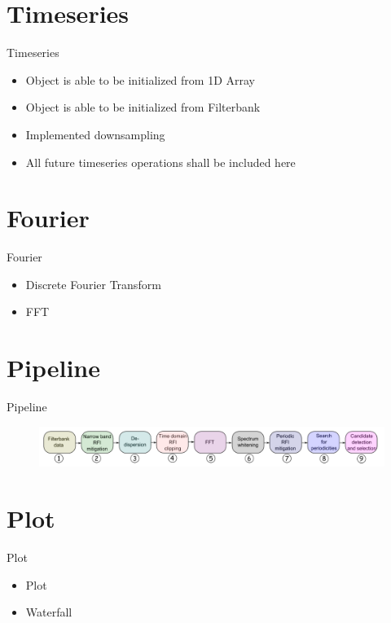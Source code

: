 \documentclass{beamer}
\begin{document}
\section{Timeseries}
\begin{frame}{Timeseries}
	\begin{itemize}
		\item Object is able to be initialized from 1D Array
		\item Object is able to be initialized from Filterbank
		\item Implemented downsampling
		\item All future timeseries operations shall be included here
	\end{itemize}
\end{frame}

\section{Fourier}
\begin{frame}{Fourier}
	\begin{itemize}
		\item Discrete Fourier Transform
		\item FFT
	\end{itemize}
\end{frame}

\section{Pipeline}
\begin{frame}{Pipeline}
	\begin{figure}
		\includegraphics[width=\textwidth]{pipeline-order}
	\end{figure}
\end{frame}

\section{Plot}
\begin{frame}{Plot}
	\begin{itemize}
		\item Plot
		\item Waterfall
	\end{itemize}
\end{frame}
\end{document}
